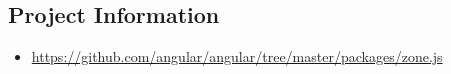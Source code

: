 \subsection{Project Information}


\begin{itemize}
  \item \url{https://github.com/angular/angular/tree/master/packages/zone.js}
\end{itemize}


